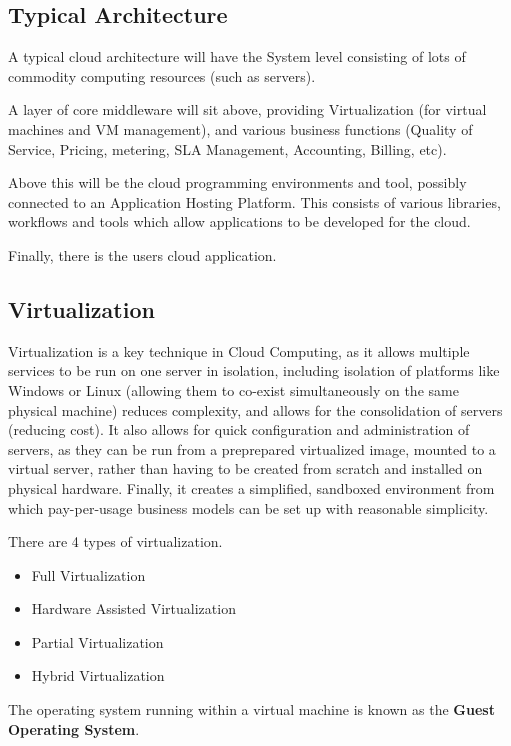\documentclass{article}
\begin{document}
\subsection{Typical Architecture}
A typical cloud architecture will have the System level consisting of lots of commodity computing resources (such as servers). 

A layer of core middleware will sit above, providing Virtualization (for virtual machines and VM management), and various business functions (Quality of Service, Pricing, metering, SLA Management, Accounting, Billing, etc). 

Above this will be the cloud programming environments and tool, possibly connected to an Application Hosting Platform. This consists of various libraries, workflows and tools which allow applications to be developed for the cloud. 

Finally, there is the users cloud application. 

\subsection{Virtualization}
Virtualization is a key technique in Cloud Computing, as it allows multiple services to be run on one server in isolation, including isolation of platforms like Windows or Linux (allowing them to co-exist simultaneously on the same physical machine) reduces complexity, and allows for the consolidation of servers (reducing cost). It also allows for quick configuration and administration of servers, as they can be run from a preprepared virtualized image, mounted to a virtual server, rather than having to be created from scratch and installed on physical hardware. Finally, it creates a simplified, sandboxed environment from which pay-per-usage business models can be set up with reasonable simplicity. 

There are 4 types of virtualization.

\begin{itemize}
    \item Full Virtualization
    \item Hardware Assisted Virtualization
    \item Partial Virtualization
    \item Hybrid Virtualization
\end{itemize}

The operating system running within a virtual machine is known as the \textbf{Guest Operating System}.
\end{document}
